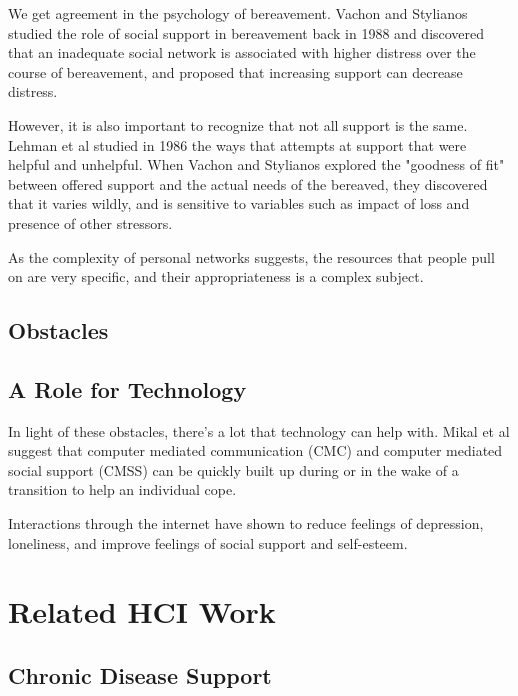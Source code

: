     We get agreement in the psychology of bereavement.
    Vachon and Stylianos studied the role of social support in bereavement back in 1988
    and discovered that an inadequate social network is associated with higher distress
    over the course of bereavement,
    and proposed that increasing support can decrease distress.

    However, it is also important to recognize that not all support is the same.
    Lehman et al studied in 1986 the ways that attempts at support that were helpful and unhelpful.
    \cite{lehman_86}
    When Vachon and Stylianos explored the "goodness of fit" between offered support and the actual needs of
    the bereaved, they discovered that it varies wildly, and is sensitive to variables such as impact of loss
    and presence of other stressors.
    \cite{vachon_88}
    
    As the complexity of personal networks suggests, the resources that people pull on
    are very specific,
    and their appropriateness is a complex subject.

  \subsection{Obstacles}

  \subsection{A Role for Technology}
    In light of these obstacles, there's a lot that technology can help with.
    Mikal et al suggest that computer mediated communication (CMC)
    and computer mediated social support (CMSS) can be quickly built up during or in the wake of
    a transition to help an individual cope.
    \cite{mikal_13}
    
    Interactions through the internet have shown to reduce feelings of depression, loneliness,
    and improve feelings of social support and self-esteem.
    \cite{shaw_02}




\section{Related HCI Work}
  \subsection{Chronic Disease Support}


